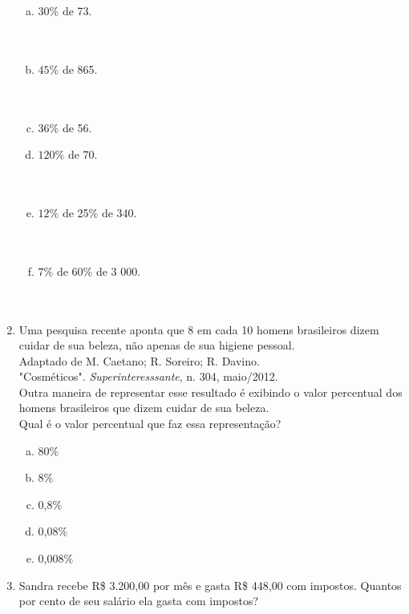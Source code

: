 \documentclass[a4paper,14pt]{article}
\begin{document}
\begin{multicols}{2}
\begin{enumerate}
\begin{enumerate}[a)]
				\item $30\%$ de 73. \\\\\\
				\item $45\%$ de 865. \\\\\\
				\item $36\%$ de 56. \\
				\item $120\%$ de 70. \\\\\\
				\item $12\%$ de 25\% de 340. \\\\\\
				\item $7\%$ de 60\% de 3 000. \\\\\\
			\end{enumerate}
			\large\item Uma pesquisa recente aponta que 8 em cada 10 homens brasileiros dizem cuidar de sua beleza, não apenas de sua higiene pessoal. \\
			\footnotesize Adaptado de M. Caetano; R. Soreiro; R. Davino. \\
			\footnotesize "Cosméticos". \textit{Superinteresssante}, n. 304, maio/2012. \\
			\normalsize Outra maneira de representar esse resultado é exibindo o valor percentual dos homens brasileiros que dizem cuidar de sua beleza. \\
			Qual é o valor percentual que faz essa representação?
			\begin{enumerate}[a)]
				\item 80\%
				\item 8\%
				\item 0,8\%
				\item 0,08\%
				\item 0,008\% \newpage
			\end{enumerate}
			\item Sandra recebe R\$ 3.200,00 por mês e gasta R\$ 448,00 com impostos. Quantos por cento de seu salário ela gasta com impostos? \\\\\\\\\\\\\\\\

\end{enumerate}
\end{multicols}
\end{document}
